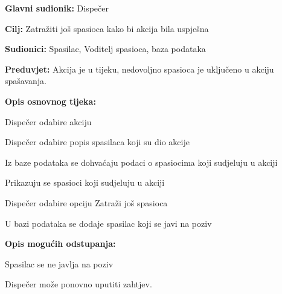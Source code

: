 		\noindent {}
		\begin{packed_item}
			
			\item \textbf{Glavni sudionik: }Dispečer
			\item  \textbf{Cilj:} Zatražiti još spasioca kako bi akcija bila uspješna
			\item  \textbf{Sudionici:} Spasilac, Voditelj spasioca, baza podataka
			\item  \textbf{Preduvjet:} Akcija je u tijeku, nedovoljno spasioca je uključeno u akciju spašavanja.
			\item  \textbf{Opis osnovnog tijeka:}
			
			\item[] \begin{packed_enum}
				
				\item Dispečer odabire akciju
				\item Dispečer odabire popis spasilaca koji su dio akcije
				\item Iz baze podataka se dohvaćaju podaci o spasiocima koji sudjeluju u akciji
				\item Prikazuju se spasioci koji sudjeluju u akciji
				\item Dispečer odabire opciju Zatraži još spasioca
				\item U bazi podataka se dodaje spasilac koji se javi na poziv
				
			\end{packed_enum}
			
			\item  \textbf{Opis mogućih odstupanja:}
			
			\item[] \begin{packed_item}
				
				\item[6.a] Spasilac se ne javlja na poziv
				\item[] \begin{packed_enum}
					
					\item Dispečer može ponovno uputiti zahtjev.
					
				\end{packed_enum}
			\end{packed_item}
		\end{packed_item}

